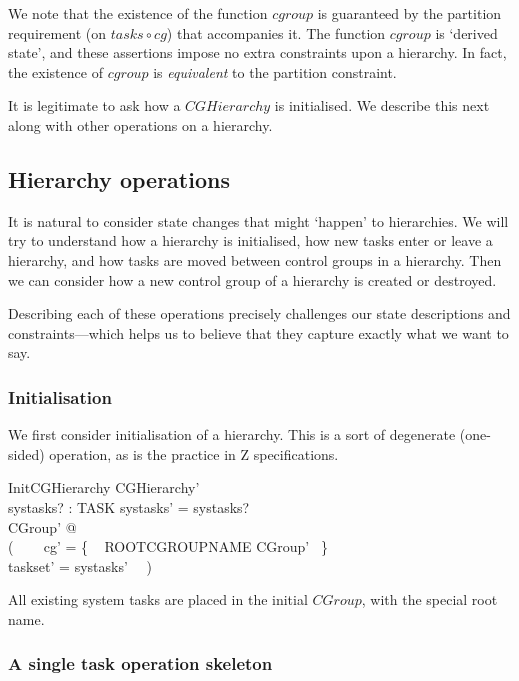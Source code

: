 \documentclass[a4paper,twoside,12pt]{article}
\begin{document}
We note that the existence of the function $cgroup$ is guaranteed by the partition requirement
(on $tasks \circ cg$) that accompanies it.
The function $cgroup$ is `derived state', and these assertions impose no extra constraints upon a hierarchy.
In fact, the existence of $cgroup$ is \emph{equivalent} to the partition constraint.

It is legitimate to ask how a $CGHierarchy$ is initialised.
We describe this next along with other operations on a hierarchy.


\subsection{Hierarchy operations}

It is natural to consider state changes that might `happen' to hierarchies.
We will try to understand how a hierarchy is initialised, how new tasks enter or leave a hierarchy,
and how tasks are moved between control groups in a hierarchy.
Then we can consider how a new control group of a hierarchy is created or destroyed.

Describing each of these operations precisely challenges our state descriptions and constraints---which helps us
to believe that they capture exactly what we want to say.

\subsubsection{Initialisation}

We first consider initialisation of a hierarchy. This is a sort of degenerate (one-sided) operation, as is the practice 
in Z specifications.

\begin{schema}{InitCGHierarchy}
CGHierarchy' \\
systasks? : \finset TASK
\where
systasks' = systasks? \\
\exists CGroup' @ \\
( ~~~ cg' = \{ ~ ROOTCGROUPNAME \mapsto \theta CGroup' ~\} \\
\land taskset' = systasks' ~~)
\end{schema}
All existing system tasks are placed in the initial $CGroup$,
with the special root name.

\subsubsection{A single task operation skeleton}
\end{document}
